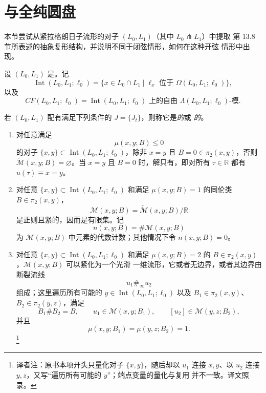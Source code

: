 \section{\termPrimaryObstruction{}与全纯圆盘}
\label{sec:primary-obstruction-holomorphic-discs}

本节尝试从紧拉格朗日子流形的对子 $(L_0,L_1)$（其中 $L_0\pitchfork L_1$）中提取
第 13.8 节所表述的抽象\personFloer{}复形结构，并说明不同于闭弦情形，\termAnomaly{}如何在这种开弦
情形中出现。

设 $(L_0,L_1)$ 是\termTransversePair{}。记
\[
 \operatorname{Int}(L_0,L_1;\ell_0)
 =\{x\in L_0\cap L_1\mid \ell_x\text{ 位于 }\Omega(L_0,L_1;\ell_0)\},
\]
以及
\[
 CF(L_0,L_1;\ell_0)
 =\operatorname{Int}(L_0,L_1;\ell_0)\text{ 上的自由 }
 \Lambda(L_0,L_1;\ell_0)\text{-模}.
\]

\begin{definition}
\label{def:anomaly-free-pair}
若 $(L_0,L_1)$ 配有满足下列条件的 $J=\{J_t\}$，则称它是\emph{\termAnomalyFree{}的}或
\emph{\termUnobstructed{}的}。
\begin{enumerate}[label=(\arabic*)]
\item 对任意满足
\[
 \mu(x,y;B)\leq0
\]
的对子 $\{x,y\}\subset\operatorname{Int}(L_0,L_1;\ell_0)$，除非 $x=y$ 且
$B=0\in\pi_2(x,y)$，否则 $\widetilde{\mathcal M}(x,y;B)=\varnothing$。当
$x=y$ 且 $B=0$ 时，解只有\termStationarySolution{}，即对所有 $\tau\in\mathbb R$ 都有
$u(\tau)\equiv x=y$。
\item 对任意 $\{x,y\}\subset\operatorname{Int}(L_0,L_1;\ell_0)$ 和满足
$\mu(x,y;B)=1$ 的同伦类 $B\in\pi_2(x,y)$，
\[
 \mathcal M(x,y;B)=\widetilde{\mathcal M}(x,y;B)/\mathbb R
\]
是\personFredholm{}正则且紧的，因而是有限集。记
\[
 n(x,y;B)=\#\mathcal M(x,y;B)
\]
为 $\mathcal M(x,y;B)$ 中元素的代数计数；其他情况下令 $n(x,y;B)=0$。
\item 对任意 $\{x,y\}\subset\operatorname{Int}(L_0,L_1;\ell_0)$ 和满足
$\mu(x,y;B)=2$ 的 $B\in\pi_2(x,y)$，$\mathcal M(x,y;B)$ 可以紧化为一个光滑
一维流形，它或者无边界，或者其边界由断裂流线
\[
 u_1\#_\infty u_2
\]
组成；这里遍历所有可能的 $y\in\operatorname{Int}(L_0,L_1;\ell_0)$ 以及
$B_1\in\pi_2(x,y)$、$B_2\in\pi_2(y,z)$，满足
\[
 B_1\#B_2=B,\qquad
 u_1\in\mathcal M(x,y;B_1),\qquad [u_2]\in\mathcal M(y,z;B_2),
\]
并且
\[
\mu(x,y;B_1)=\mu(y,z;B_2)=1.
\]
\footnote{译者注：原书本项开头只量化对子 $\{x,y\}$，随后却以 $u_1$ 连接
$x,y$、以 $u_2$ 连接 $y,z$，又写“遍历所有可能的 $y$”；端点变量的量化与复用
并不一致。译文照录。}
\end{enumerate}
\end{definition}

